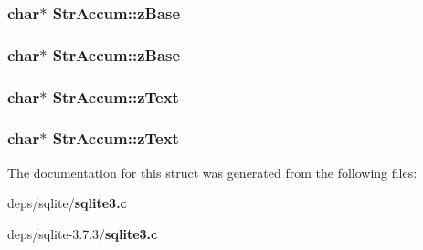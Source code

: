 \subsubsection{\setlength{\rightskip}{0pt plus 5cm}char$\ast$ \bf{Str\-Accum::z\-Base}}\label{structStrAccum_93dd946866c3bd1dcf9245ef6282e180}


\subsubsection{\setlength{\rightskip}{0pt plus 5cm}char$\ast$ \bf{Str\-Accum::z\-Base}}\label{structStrAccum_93dd946866c3bd1dcf9245ef6282e180}


\subsubsection{\setlength{\rightskip}{0pt plus 5cm}char$\ast$ \bf{Str\-Accum::z\-Text}}\label{structStrAccum_293bbe5f06b8a2d5f0e7a63826041ff0}


\subsubsection{\setlength{\rightskip}{0pt plus 5cm}char$\ast$ \bf{Str\-Accum::z\-Text}}\label{structStrAccum_293bbe5f06b8a2d5f0e7a63826041ff0}




The documentation for this struct was generated from the following files:\begin{CompactItemize}
\item 
deps/sqlite/\bf{sqlite3.c}\item 
deps/sqlite-3.7.3/\bf{sqlite3.c}\end{CompactItemize}
